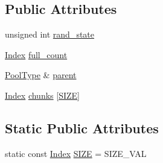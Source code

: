 \subsection*{Public Attributes}
\begin{DoxyCompactItemize}
\item 
unsigned int \hyperlink{structMemPoolBank_af9787855d48c00526151a602cb890f10}{rand\-\_\-state}
\item 
\hyperlink{structMemPoolBank_a5f3e0490f2f4fe5dbf321cc00eb35007}{Index} \hyperlink{structMemPoolBank_ad34b898caec6f8150db61db5da563683}{full\-\_\-count}
\item 
\hyperlink{structMemPoolBank_afae3596e9bd9f9245bc55fbe47356e96}{Pool\-Type} \& \hyperlink{structMemPoolBank_a2333639e39620bbefb2148cf4cee3c4a}{parent}
\item 
\hyperlink{structMemPoolBank_a5f3e0490f2f4fe5dbf321cc00eb35007}{Index} \hyperlink{structMemPoolBank_a85a00715ded7421c4be8ca40ea015865}{chunks} \mbox{[}\hyperlink{structMemPoolBank_afdb50a6709dbca571d8e3fee281ebb12}{S\-I\-Z\-E}\mbox{]}
\end{DoxyCompactItemize}
\subsection*{Static Public Attributes}
\begin{DoxyCompactItemize}
\item 
static const \hyperlink{structMemPoolBank_a5f3e0490f2f4fe5dbf321cc00eb35007}{Index} \hyperlink{structMemPoolBank_afdb50a6709dbca571d8e3fee281ebb12}{S\-I\-Z\-E} = S\-I\-Z\-E\-\_\-\-V\-A\-L
\end{DoxyCompactItemize}



